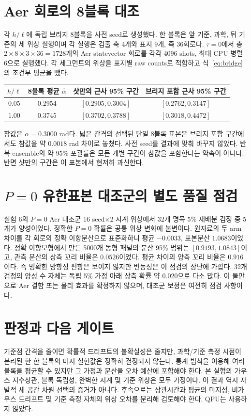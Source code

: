 \documentclass[11pt,a4paper]{article}
\begin{document}
\section{Aer 회로의 8블록 대조}
각 $h/\ell$에 독립 브리지 8블록을 사전 seed로 생성했다. 한
블록은 앞 기준, 과학, 뒤 기준의 세 위상 실행이며 각 실행은
검출 축 4개와 표지 9개, 즉 36회로다. $\tau=0$에서 총
$2\times8\times3\times36=1728$개의 Aer statevector 회로를
각각 4096 shots, 최대 CPU 병렬 6으로 실행했다. 각 세그먼트의
위상을 표지별 raw counts로 적합하고 식~\eqref{eq:bridge}의
조건부 평균을 뺐다.
\begin{center}
\begin{tabular}{@{}cccc@{}}
\toprule
$h/\ell$ & 8블록 평균 $\hat\alpha$ & 샷만의 근사 95\% 구간
& 브리지 포함 근사 95\% 구간 \\
\midrule
0.05 & 0.2954 & $[0.2905,0.3004]$ & $[0.2762,0.3147]$ \\
1.00 & 0.3745 & $[0.3702,0.3788]$ & $[0.3018,0.4472]$ \\
\bottomrule
\end{tabular}
\end{center}
참값은 $\alpha=0.3000$ rad다. 넓은 간격의 선택된 단일 8블록
표본은 브리지 포함 구간에서도 참값을 약 $0.0018$ rad 차이로
놓쳤다. 사전 seed를 결과에 맞춰 바꾸지 않았다. 반복-ensemble의
약 95\% 포괄률은 모든 개별 구간이 참값을 포함한다는 약속이
아니다. 반면 샷만의 구간은 이 표본에서 현저히 과신한다.

\section{$P=0$ 유한표본 대조군의 별도 품질 점검}
실험 6의 $P=0$ Aer 대조군 16 seed$\times$2 시계 위상에서
32개 명목 5\% 재배분 검정 중 5개가 양성이었다. 정확한 $P=0$
확률은 공통 위상 변화에 불변이다. 원자료의 두 arm 차이를 각
회로의 정확 이항분산으로 표준화하니 평균 $-0.0033$, 표본분산
$1.0683$이었다. 정확 이항모형에서 만든 5000개 동형 패널의
분산 95\% 범위는 $[0.9193,1.0843]$이고, 관측 분산의 상측 꼬리
비율은 $0.0526$이었다. 평균 차이의 양측 꼬리 비율은 $0.916$이다.
즉 명확한 방향성 편향은 보이지 않지만 변동성은 이 점검의
상단에 가깝다. 32개 검정의 양성 수 자체는 독립 5\% 가정 아래
상측 확률 약 $0.020$으로 다소 많다. 이 둘만으로 Aer 결함 또는
물리 효과를 확정하지 않으며, 대조군 보정은 여전히 점검 사항이다.

\section{판정과 다음 게이트}
기준점 간격을 줄이면 확률적 드리프트의 불확실성은 줄지만,
과학/기준 측정 시점이 분리된 한 한 블록의 미지 실현값은 정확히
결정되지 않는다. 통계 법칙을 이용해 여러 블록을 평균할 수
있지만 그 가정과 분산을 오차 예산에 포함해야 한다. 본 실험의
가우스 지수상관, 블록 독립성, 완벽한 시계 및 기준 위상은 모두
가정이다. 이 결과 역시 자발적 세 공간 차원 선택의 증거가 아니다.
후속으로는 상관시간과 평균의 미지성, 비가우스 드리프트 및 기준
측정 자체의 위상 오차를 분리해 검토해야 한다. QPU는 사용하지 않았다.
\end{document}
